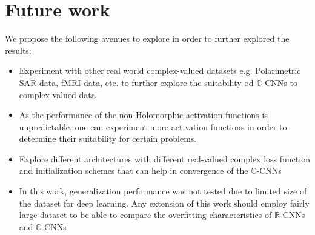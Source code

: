 \chapter{Future work}
We propose the following avenues to explore in order to further explored the results:
\begin{itemize}
	\item Experiment with other real world complex-valued datasets e.g.  Polarimetric SAR data, fMRI data, etc. to further explore the suitability od $\mathbb{C}$-CNNs to complex-valued data
	\item As the performance of the non-Holomorphic activation functions is unpredictable, one can experiment more activation functions in order to determine their suitability for certain problems.
	\item Explore different architectures with different real-valued complex loss function and initialization schemes that can help in convergence of the $\mathbb{C}$-CNNs
	\item In this work, generalization performance was not tested due to limited size of the dataset for deep learning. Any extension of this work should employ fairly large dataset to be able to compare the overfitting characteristics of $\mathbb{R}$-CNNs and $\mathbb{C}$-CNNs 
	
\end{itemize} 